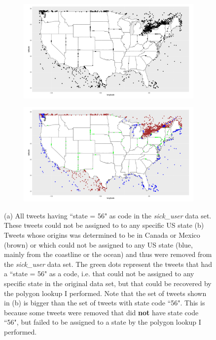 \documentclass[11pt, a4paper]{report}\usepackage[]{graphicx}\usepackage[]{color}
\begin{document}
\begin{figure}[h]
  \centering
    \begin{subfigure}[t]{0.9\textwidth}
    \includegraphics[width=1\linewidth]{state56_sick_raw_df.png}
    \caption{}
    \label{fig:code56}
  \end{subfigure}
  \begin{subfigure}[t]{0.9\textwidth}
  \includegraphics[width=1\linewidth]{CanexicoAndRemoved_sick_raw_df.png}
  \caption{}
  \label{fig:canexico_and_removed}
  \end{subfigure}
  \caption{(a) All tweets having ``state = 56" as code in the \textit{sick\_user} data set. These tweets could not be assigned to to any specific US state (b) Tweets whose origins was determined to be in Canada or Mexico (brown) or which could not be assigned to any US state (blue, mainly from the coastline or the ocean) and thus were removed from the \textit{sick\_user} data set. The green dots represent the tweets that had a ``state = 56" as  a code, i.e. that could not be assigned to any specific state in the original data set, but that could be recovered by the polygon lookup I performed. Note that the set of tweets shown in (b) is bigger than the set of tweets with state code ``56". This is because some tweets were removed that did \textbf{not} have state code ``56", but failed to be assigned to a state by the polygon lookup I performed.}
  \end{figure}
\end{document}
